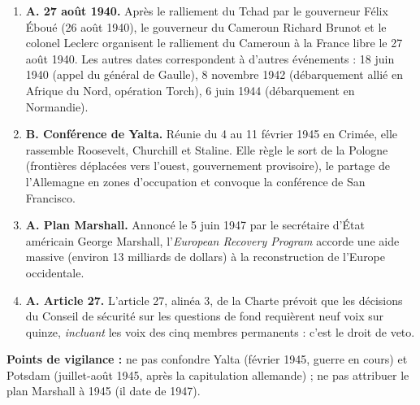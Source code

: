 \documentclass[11pt]{article}
\begin{document}
\begin{corrige}
\begin{enumerate}
\item \textbf{A. 27 août 1940.} Après le ralliement du Tchad par le gouverneur Félix Éboué (26 août 1940), le gouverneur du Cameroun Richard Brunot et le colonel Leclerc organisent le ralliement du Cameroun à la France libre le 27 août 1940. Les autres dates correspondent à d'autres événements : 18 juin 1940 (appel du général de Gaulle), 8 novembre 1942 (débarquement allié en Afrique du Nord, opération Torch), 6 juin 1944 (débarquement en Normandie).
\item \textbf{B. Conférence de Yalta.} Réunie du 4 au 11 février 1945 en Crimée, elle rassemble Roosevelt, Churchill et Staline. Elle règle le sort de la Pologne (frontières déplacées vers l'ouest, gouvernement provisoire), le partage de l'Allemagne en zones d'occupation et convoque la conférence de San Francisco.
\item \textbf{A. Plan Marshall.} Annoncé le 5 juin 1947 par le secrétaire d'État américain George Marshall, l'\emph{European Recovery Program} accorde une aide massive (environ 13 milliards de dollars) à la reconstruction de l'Europe occidentale.
\item \textbf{A. Article 27.} L'article 27, alinéa 3, de la Charte prévoit que les décisions du Conseil de sécurité sur les questions de fond requièrent neuf voix sur quinze, \emph{incluant} les voix des cinq membres permanents : c'est le droit de veto.
\end{enumerate}
\textbf{Points de vigilance :} ne pas confondre Yalta (février 1945, guerre en cours) et Potsdam (juillet-août 1945, après la capitulation allemande) ; ne pas attribuer le plan Marshall à 1945 (il date de 1947).
\end{corrige}
\end{document}
